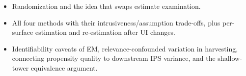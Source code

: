 \begin{interviewq}

\goodgreat
\begin{itemize}
    \item {} Randomization and the idea that swaps estimate examination.
    \item {} All four methods with their intrusiveness/assumption trade-offs, plus per-surface estimation and re-estimation after UI changes.
    \item {} Identifiability caveats of EM, relevance-confounded variation in harvesting, connecting propensity quality to downstream IPS variance, and the shallow-tower equivalence argument.
\end{itemize}

\end{interviewq}

